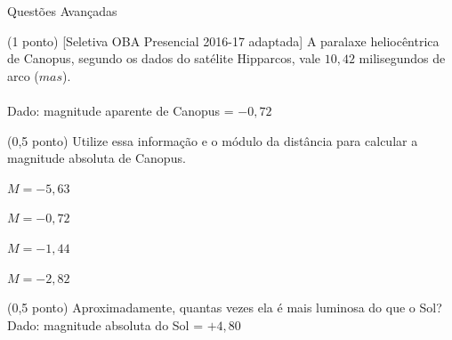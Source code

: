\documentclass{../lista}
\begin{document}
\begin{secao}{Questões Avançadas}
		\begin{questao}{(1 ponto) [Seletiva OBA Presencial 2016-17 adaptada]}
			A paralaxe heliocêntrica de Canopus, segundo os dados do satélite Hipparcos, vale $10,42$ milisegundos de arco ($mas$). \\ \\
			Dado: magnitude aparente de Canopus = $-0,72$
			
			\begin{pergunta}{(0,5 ponto)}
				Utilize essa informação e o módulo da distância para calcular a magnitude absoluta de Canopus.
				
				
				\begin{alternativas}
					\alternativaMarcada $M = -5,63$
					\item $M = -0,72$
					\item $M = -1,44$
					\item $M = -2,82$
				\end{alternativas}
			\end{pergunta}
			
			\begin{pergunta}{(0,5 ponto)}
				Aproximadamente, quantas vezes ela é mais luminosa do que o Sol? \\
				Dado: magnitude absoluta do Sol = $+4,80$
				
				

\end{pergunta}
\end{questao}
\end{secao}
\end{document}
